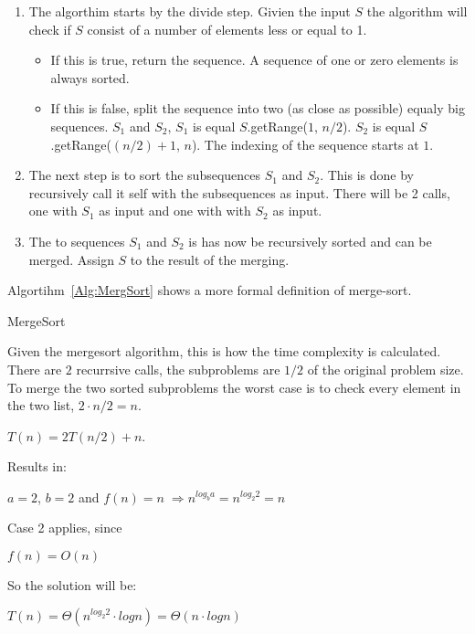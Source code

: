 \begin{enumerate}
\item The algorthim starts by the divide step. Givien the input $S$ the algorithm will check if $S$ consist of a number of elements less or equal to 1.
\begin{itemize}
\item If this is true, return the sequence. A sequence of one or zero elements is always sorted.  
\item If this is false, split the sequence into two (as close as possible) equaly big sequences. $S_1$ and $S_2$, $S_1$ is equal $S$.getRange($1$, $n/2$).
$S_2$ is equal $S$.getRange($(n/2)+1$, $n$). The indexing of the sequence starts at $1$.
\end{itemize}
\item The next step is to sort the subsequences $S_1$ and $S_2$. This is done by recursively call it self with the subsequences as input. There will be 2 calls, one with $S_1$ as input and one with with $S_2$ as input.
\item The to sequences $S_1$ and $S_2$ is has now be recursively sorted and can be merged. Assign $S$ to the result of the merging.
\end{enumerate}
Algortihm~\ref{Alg:MergSort} shows a more formal definition of merge-sort.

\begin{algorithm}
\DontPrintSemicolon
{}
\caption{MergeSort}
\label{Alg:MergSort}
\end{algorithm}

Given the mergesort algorithm, this is how the time complexity is calculated.
There are $2$ recurrsive calls, the subproblems are $1/2$ of the original problem size. To merge the two sorted subproblems the worst case is to check every element in the two list, $2 \cdot n/2 = n$. 
\begin{center}
 $T(n) = 2T(n/2) + n$.
\end{center}
Results in: 
\begin{center}
$a = 2$, $b = 2$ and $f(n) = n \;
\Rightarrow n^{log_b a} = n^{log_2 2} = n$
\end{center}
Case 2 applies, since
\begin{center}
$f(n) = O(n)$
\end{center}
So the solution will be:
\begin{center}
$T(n) = \Theta(n^{log_2 2} \cdot log n) = \Theta(n \cdot log n)$
\end{center}

